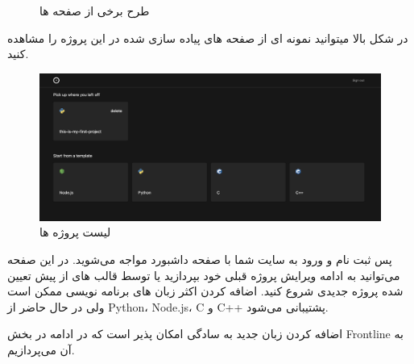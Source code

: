 \begin{figure}[htbp]
    \caption{طرح برخی از صفحه ها}
\end{figure}

در شکل بالا میتوانید نمونه ای از صفحه های پیاده سازی شده در این پروژه را مشاهده کنید.


\begin{figure}[h]
    \centering
    \includegraphics[width=1\textwidth]{./3-Design/projects.png}
    \caption{لیست پروژه ها}
    \label{fig:projects}
\end{figure}

پس ثبت نام و ورود به سایت شما با صفحه داشبورد مواجه می‌شوید. در این صفحه می‌توانید به ادامه ویرایش پروژه قبلی خود بپردازید یا توسط قالب های از پیش تعیین شده پروژه جدیدی شروع کنید.
اضافه کردن اکثر زبان های برنامه نویسی ممکن است ولی در حال حاضر از Python، Node.js، C و C++ پشتیبانی می‌شود.

اضافه کردن زبان جدید به سادگی امکان پذیر است که در ادامه در بخش Frontline به آن می‌پردازیم.

